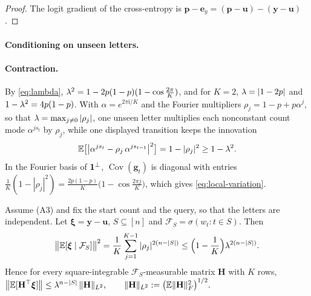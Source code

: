 \begin{proof}
The logit gradient of the cross-entropy is $\bm p-\bm e_y=(\bm p-\bm u)-(\bm y-\bm u)$.
\end{proof}

\paragraph{Conditioning on unseen letters.}
\label{app:target-spectrum}

\paragraph{Contraction.}\label{app:contraction} By \cref{eq:lambda}, $\mixrate^2=1-2p(1-p)(1-\cos\tfrac{2\pi}{K})$, and for $K=2$,
$\lambda=|1-2p|$ and $1-\lambda^2=4p(1-p)$. With $\alpha=e^{2\pi\mathrm i/K}$ and the Fourier multipliers
$\rho_j=1-p+p\alpha^j$, so that $\lambda=\max_{j\ne0}|\rho_j|$, one unseen letter multiplies each nonconstant count
mode $\alpha^{js_t}$ by $\rho_j$, while one displayed transition keeps the innovation
\begin{equation}
 \mathbb E\bigl[\bigl|\alpha^{j s_t}-\rho_j\,\alpha^{j s_{t-1}}\bigr|^2\bigr]=1-|\rho_j|^2\ge1-\lambda^2 .
 \label{eq:move-variance}
\end{equation}
In the Fourier basis of $\mathbf 1^\perp$, $\operatorname{Cov}(\bm g_t)$ is diagonal with entries $\tfrac{1}{K}(1-|\rho_j|^2)=\tfrac{2p(1-p)}{K}\bigl(1-\cos\tfrac{2\pi j}{K}\bigr)$,
which gives \cref{eq:local-variation}.

\begin{lemma}
\label{lem:target-contraction}
Assume (A3) and fix the start count and the query, so that the letters are independent. Let $\bm\xi=\bm y-\bm u$, $S\subseteq[n]$ and $\mathcal F_S=\sigma(w_t:t\in S)$. Then
\begin{equation}
 \bigl\|\mathbb E[\bm\xi\mid\mathcal F_S]\bigr\|^2=\frac{1}{K}\sum_{j=1}^{K-1}|\rho_j|^{2(n-|S|)}\le\Bigl(1-\frac{1}{K}\Bigr)\lambda^{2(n-|S|)} .
 \label{eq:horizon}
\end{equation}
Hence for every square-integrable $\mathcal F_S$-measurable matrix $\mathbf H$ with $K$ rows,
 $\bigl\|\mathbb E[\mathbf H^\top\bm\xi]\bigr\|\le\lambda^{n-|S|}\,\|\mathbf H\|_{L^2},\qquad \|\mathbf H\|_{L^2}:=\bigl(\mathbb E\|\mathbf H\|_F^2\bigr)^{1/2}.$ 
\end{lemma}

